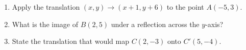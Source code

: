 \documentclass[12pt, twoside]{article}
\begin{document}
\begin{enumerate}
 \item Apply the translation $(x,y) \rightarrow (x+1,y+6)$ to the point $A(-5,3)$. \vspace{2cm}
 \item What is the image of $B(2,5)$ under a reflection across the $y$-axis? \vspace{2cm}
 \item State the translation that would map $C(2,-3)$ onto $C'(5,-4)$. \vspace{1cm}


\end{enumerate}
\end{document}
